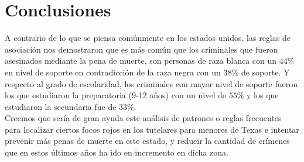 \documentclass[sigconf]{acmart}
\begin{document}
\section{Conclusiones}
A contrario de lo que se piensa comúnmente en los estados unidos, las reglas de asociación nos demostraron que es más común que los criminales que fueron asesinados mediante la pena de muerte, son personas de raza blanca con un $44\%$ en nivel de soporte en contradicción de la raza negra con un $38\%$ de soporte. Y respecto al grado de escolaridad, los criminales con mayor nivel de soporte fueron los que estudiaron la preparatoria (9-12 años) con un nivel de $55\%$ y los que estudiaron la secundaria fue de $33\%$.\\ Creemos que sería de gran ayuda este análisis de patrones o reglas frecuentes para localizar ciertos focos rojos en los tutelares para menores de Texas e intentar prevenir más penas de muerte en este estado, y reducir la cantidad de crímenes que en estos últimos años ha ido en incremento en dicha zona.\\




{}


 
\end{document}
